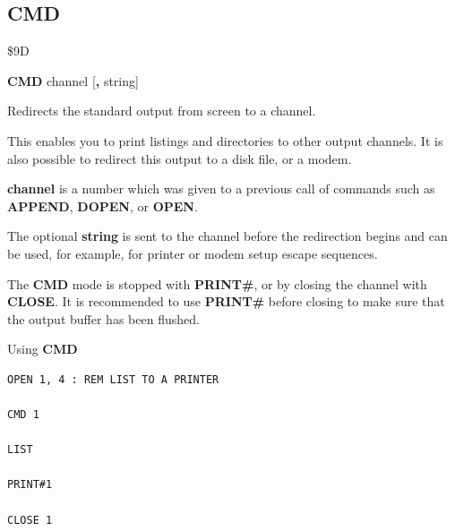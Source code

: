 \subsection{CMD}
\begin{description}[leftmargin=2cm,style=nextline]
\item [Token:]   \$9D

\item [Format:]  {\bf CMD} channel [{\bf,} string]

\item [Usage:]   Redirects the standard output from screen to a channel.

                 This enables you to print listings and directories to other output channels. It is also possible to redirect this output to a disk file, or a modem.

                 {\bf channel} is a number which was given to a previous call of commands such as {\bf APPEND}, {\bf DOPEN}, or {\bf OPEN}.

                 The optional {\bf string} is sent to the channel before the redirection begins and can be used, for example, for printer or modem setup escape sequences.

\item [Remarks:] The {\bf CMD} mode is stopped with {\bf PRINT\#}, or by closing the channel with {\bf CLOSE}. It is recommended to use {\bf PRINT\#} before closing to make sure that the output buffer has been flushed.

\item [Example:] Using {\bf CMD}

\begin{tcolorbox}[colback=black,coltext=white]
\verbatimfont{\codefont}
\begin{verbatim}
OPEN 1, 4 : REM LIST TO A PRINTER

CMD 1

LIST

PRINT#1

CLOSE 1
\end{verbatim}
\end{tcolorbox}
\end{description}


\newpage
